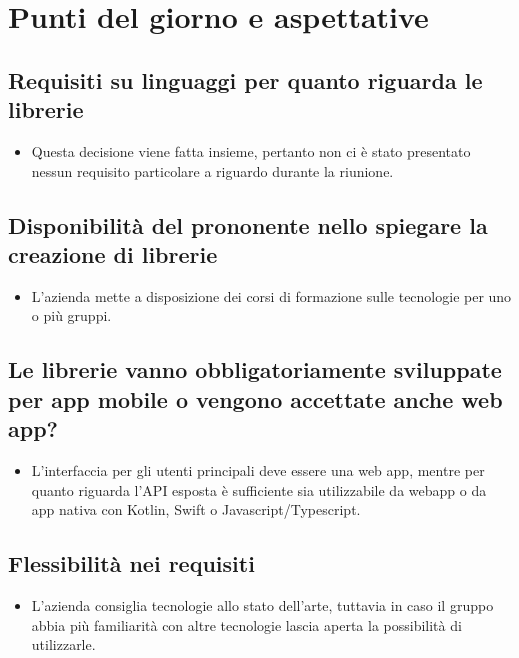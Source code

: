 \section{Punti del giorno e aspettative}
    \subsection{Requisiti su linguaggi per quanto riguarda le librerie}
        \begin{itemize}
            \item Questa decisione viene fatta insieme, pertanto non ci è stato presentato nessun requisito particolare a riguardo durante la riunione.
        \end{itemize}
    \subsection{Disponibilità del prononente nello spiegare la creazione di librerie}
        \begin{itemize}
            \item L'azienda mette a disposizione dei corsi di formazione sulle tecnologie per uno o più gruppi.
        \end{itemize}
    \subsection{Le librerie vanno obbligatoriamente sviluppate per app mobile o vengono accettate anche web app?}
        \begin{itemize}
            \item L'interfaccia per gli utenti principali deve essere una web app, mentre per quanto riguarda l'API esposta è sufficiente sia utilizzabile da webapp o da app nativa con Kotlin, Swift o Javascript/Typescript.
        \end{itemize}
    \subsection{Flessibilità nei requisiti}
        \begin{itemize}
            \item L'azienda consiglia tecnologie allo stato dell'arte, tuttavia in caso il gruppo abbia più familiarità con altre tecnologie lascia aperta la possibilità di utilizzarle.
        \end{itemize}